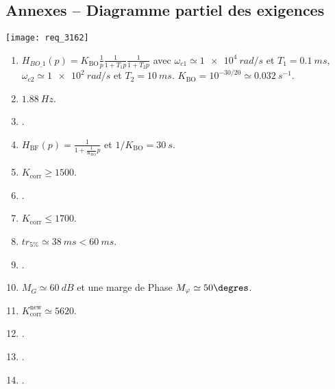 \begin{multicols}{2}
\subsection*{Annexes -- Diagramme partiel des exigences\label{Annexe_diag_exigences}}
\begin{center}
\texttt{[image: req\_3162]}
\end{center}
\fi






\ifprof
\else
\footnotesize
\begin{enumerate}
\item $H_{BO\_1}(p) = K_{\text{BO}}  \frac{1}{p} \frac{1}{1+T_1p}  \frac{1}{1+T_2p} $ avec 
$\omega_{c1} \simeq \SI{1e4}{rad/s}$ et $T_1 = \SI{0,1}{ms}$, 
$\omega_{c2} \simeq \SI{1e2}{rad/s}$ et $T_2 = \SI{10}{ms}$. $K_{\text{BO}} = 10^{-30/20} \simeq  \SI{0,032}{s^{-1}}$.
\item $\SI{1,88}{Hz}$.
\item .
\item $H_{\text{BF}}(p)= \frac{1}{1+\frac{1}{K_{\text{BO}}}p}$ et $1/K_{\text{BO}} =\SI{30}{s}$.\\
\item $K_{\text{corr}} \ge  1500$.
\item .
\item $K_{\text{corr}} \leq  1700$.
\item $tr_{5\%} \simeq  \SI{38}{ms} < \SI{60}{ms}$.
\item .
\item $M_G \simeq \SI{60}{dB}$ et une marge de Phase $M_{\varphi} \simeq 50\degres$.
\item $K_{\text{corr}}^{\text{new}} \simeq 5620$.
\item .
\item .
\item .
\end{enumerate}

\normalsize
\end{multicols}
\fi



